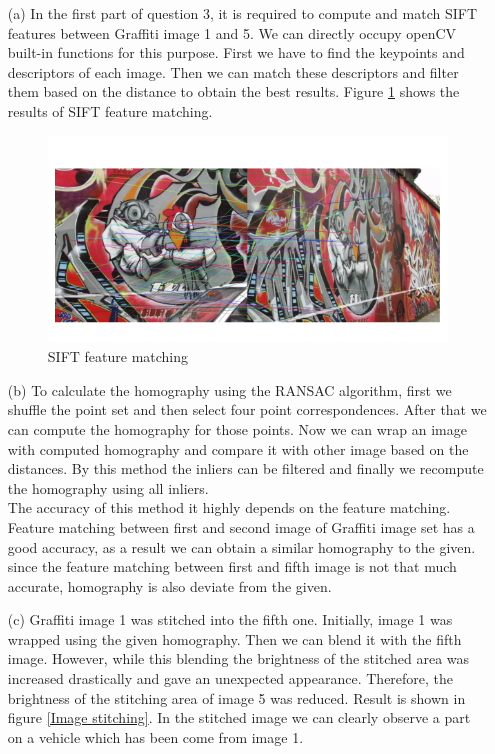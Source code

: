 \documentclass[11pt]{article}
\begin{document}
\begin{itemize}
    \item[(a)] In the first part of question 3, it is required to compute and match SIFT features between Graffiti image 1 and 5.
    We can directly occupy openCV built-in functions for this purpose. First we have to find the keypoints and descriptors of each image. Then we
    can match these descriptors and filter them based on the distance to obtain the best results. Figure \ref{SIFT feature matching} shows the 
    results of SIFT feature matching.

    \begin{figure}
        \centering
        \includegraphics[width=\textwidth]{Images/31.png}
        \caption{SIFT feature matching}
        \label{SIFT feature matching}
    \end{figure}

    \item[(b)] To calculate the homography using the RANSAC algorithm, first we shuffle the point set and then select four point correspondences. 
    After that we can compute the homography for those points. Now we can wrap an image with computed homography and compare it with other image 
    based on the distances. By this method the inliers can be filtered and finally we recompute the homography using all inliers. \cite{RANSACHomography} \\
    The accuracy of this method it highly depends on the feature matching. Feature matching between first and second image of Graffiti image set
    has a good accuracy, as a result we can obtain a similar homography to the given. since the feature matching between first and fifth image is
    not that much accurate, homography is also deviate from the given.
    
    \item[(c)] Graffiti image 1 was stitched into the fifth one. Initially, image 1 was wrapped using the given homography. Then we can blend it 
    with the fifth image. However, while this blending the brightness of the stitched area was increased drastically and gave an unexpected appearance.
    Therefore, the brightness of the stitching area of image 5 was reduced. Result is shown in figure \ref{Image stitching}. In the stitched image 
    we can clearly observe a part on a vehicle which has been come from image 1.
    

\end{itemize}
\end{document}
